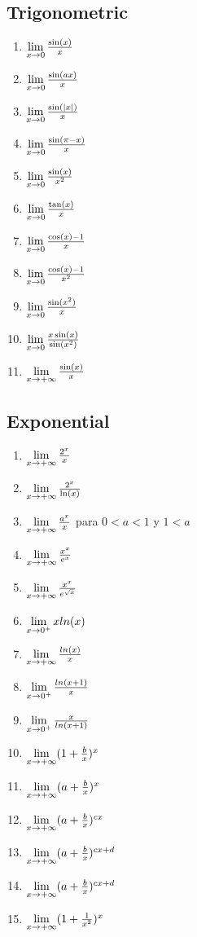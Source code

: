 \subsection{Trigonometric}

\begin{enumerate}
    \item  $\lim\limits_{x \rightarrow 0}  \frac{\sin(x)}{x}$
    \item  $\lim\limits_{x \rightarrow 0}  \frac{\sin(ax)}{x}$
    \item  $\lim\limits_{x \rightarrow 0}  \frac{\sin(|x|)}{x}$
    \item  $\lim\limits_{x \rightarrow 0}  \frac{\sin(\pi-x)}{x}$
    \item  $\lim\limits_{x \rightarrow 0}  \frac{\sin(x)}{x^2}$
    \item  $\lim\limits_{x \rightarrow 0}  \frac{\tan(x)}{x}$

    \item  $\lim\limits_{x \rightarrow 0}  \frac{\cos(x)-1}{x}$
    \item  $\lim\limits_{x \rightarrow 0}  \frac{\cos(x)-1}{x^2}$
    \item  $\lim\limits_{x \rightarrow 0}  \frac{\sin(x^2)}{x}$
    \item  $\lim\limits_{x \rightarrow 0}  \frac{x \sin(x)}{\sin(x^2)}$


    \item  $\lim\limits_{x \rightarrow +\infty}  \frac{\sin(x)}{x}$

\end{enumerate}
\subsection{Exponential}
\begin{enumerate}
    \item  $\lim\limits_{x \rightarrow +\infty}  \frac{2^x}{x}$
    \item  $\lim\limits_{x \rightarrow +\infty}  \frac{2^x}{\ln(x)}$
    \item  $\lim\limits_{x \rightarrow +\infty}  \frac{a^x}{x}$   para $0<a<1$ y $1<a$
    \item  $\lim\limits_{x \rightarrow +\infty}  \frac{x^x}{e^x}$
    \item  $\lim\limits_{x \rightarrow +\infty}  \frac{x^x}{e^{\sqrt{x}} }$

    \item  $\lim\limits_{x \rightarrow 0^{+}} x ln(x)$
    \item  $\lim\limits_{x \rightarrow +\infty}  \frac{ln(x)}{x}$
    \item  $\lim\limits_{x \rightarrow 0^{+}}  \frac{ln(x+1)}{x}$
    \item  $\lim\limits_{x \rightarrow 0^{+}}  \frac{x}{ln(x+1)}$


    \item  $\lim\limits_{x \rightarrow +\infty}  (1+\frac{b}{x})^{x}$
    \item  $\lim\limits_{x \rightarrow +\infty}  (a+\frac{b}{x})^{x}$
    \item  $\lim\limits_{x \rightarrow +\infty}  (a+\frac{b}{x})^{cx}$
    \item  $\lim\limits_{x \rightarrow +\infty}  (a+\frac{b}{x})^{cx+d}$
    \item  $\lim\limits_{x \rightarrow +\infty}  (a+\frac{b}{x})^{cx+d}$
    \item  $\lim\limits_{x \rightarrow +\infty}  (1+\frac{1}{x^2})^{x}$
\end{enumerate}

